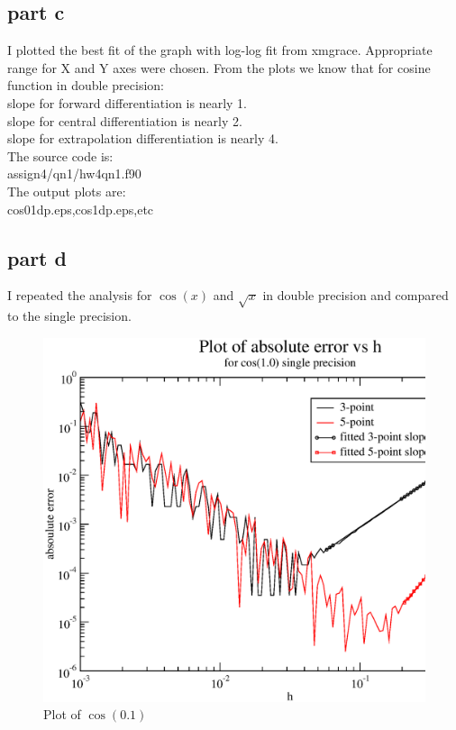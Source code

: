 \documentclass[11pt,a4paper,english]{article}
\begin{document}
	
	
	
	
	\subsection{part c}

	
	I plotted the best fit of the graph with log-log fit from xmgrace.
	Appropriate range for X and Y axes were chosen.
	From the plots we know that for cosine function in double precision:\\
	slope for forward differentiation is nearly 1.\\
	slope for central differentiation is nearly 2.\\
	slope for extrapolation differentiation is nearly 4.\\
	
	The source code is:\\
	assign4/qn1/hw4qn1.f90\\
	
	The output plots are:\\
	cos01dp.eps,cos1dp.eps,etc\\
	
	
	
	\subsection{part d}
	
	I repeated the analysis for $\cos(x)$ and $\sqrt{x}$ in double precision and
	compared to the single precision.
	
	\begin{figure}[h!]
	\centering
	\includegraphics [scale=0.6]{hw4qn2_1.eps}
	\caption{Plot of $ \cos(0.1)$ }
	\end{figure}
	
\end{document}
